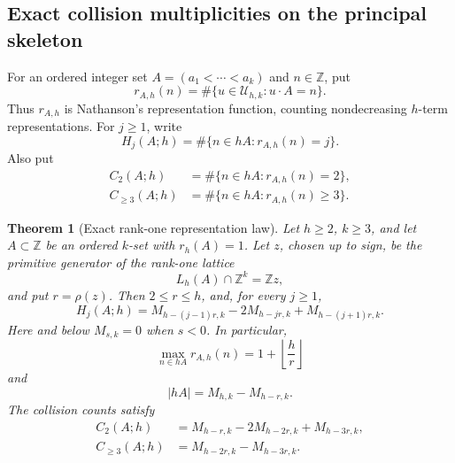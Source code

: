 \documentclass[11pt,reqno]{amsart}
\newtheorem{theorem}{Theorem}[section]
\theoremstyle{definition}
\theoremstyle{remark}
\begin{document}
\subsection{Exact collision multiplicities on the principal skeleton}
\label{subsec:rankone-multiplicity}

For an ordered integer set
$A=(a_1<\cdots<a_k)$ and $n\in\mathbb Z$, put
\[
 r_{A,h}(n)
 =
 \#\{u\in\mathcal U_{h,k}:u\cdot A=n\}.
\]
Thus $r_{A,h}$ is Nathanson's representation function, counting
nondecreasing $h$-term representations.  For $j\geq1$, write
\[
 H_j(A;h)=\#\{n\in hA:r_{A,h}(n)=j\}.
\]
Also put
\[
\begin{aligned}
  C_2(A;h)&=\#\{n\in hA:r_{A,h}(n)=2\},\\
  C_{\geq3}(A;h)&=\#\{n\in hA:r_{A,h}(n)\geq3\}.
 \end{aligned}
\]
\par\medskip
\begin{theorem}[Exact rank-one representation law]
\label{thm:rankone-multiplicity}
Let $h\geq2$, $k\geq3$, and let $A\subset\mathbb Z$ be an ordered
$k$-set with $r_h(A)=1$.  Let $z$, chosen up to sign, be the primitive
generator of the rank-one lattice
\[
 L_h(A)\cap\mathbb Z^k=\mathbb Zz,
\]
and put $r=\rho(z)$.  Then $2\leq r\leq h$, and, for every $j\geq1$,
\begin{equation}\label{eq:rankone-multiplicity}
 \boxed{\quad
 H_j(A;h)
 =
 M_{h-(j-1)r,k}
 -2M_{h-jr,k}
 +M_{h-(j+1)r,k}.
 \quad}
\end{equation}
Here and below $M_{s,k}=0$ when $s<0$.  In particular,
\begin{equation}\label{eq:rankone-max-multiplicity}
 \max_{n\in hA}r_{A,h}(n)
 =1+\left\lfloor\frac hr\right\rfloor
\end{equation}
and
\[
 |hA|=M_{h,k}-M_{h-r,k}.
\]
The collision counts satisfy
\begin{align}
 C_2(A;h)
 &=M_{h-r,k}-2M_{h-2r,k}+M_{h-3r,k},
 \label{eq:rankone-simple-collisions}\\
 C_{\geq3}(A;h)
 &=M_{h-2r,k}-M_{h-3r,k}.
 \label{eq:rankone-multiple-collisions}
\end{align}
\end{theorem}
\end{document}
